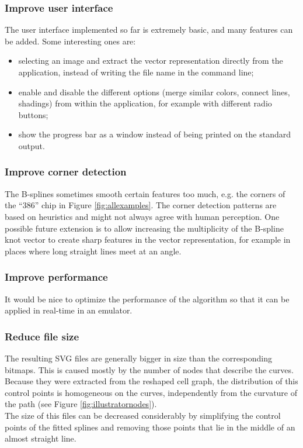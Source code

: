 \documentclass[]{usiinfbachelorproject}
\begin{document}
\subsubsection{Improve user interface}

The user interface implemented so far is extremely basic, and many features can be added. Some interesting ones are: 
\begin{itemize}
	\item selecting an image and extract the vector representation directly from the application, instead of writing the file name in the command line;
	\item enable and disable the different options (merge similar colors, connect lines, shadings) from within the application, for example with different radio buttons;
	\item show the progress bar as a window instead of being printed on the standard output.
\end{itemize}

\subsubsection{Improve corner detection}

The B-splines sometimes smooth certain features too much, e.g. the corners of the ``386'' chip in Figure \ref{fig:allexamples}. The corner detection patterns are based on heuristics and might not always agree with human perception. One possible future extension is to allow increasing the multiplicity of the B-spline knot vector to create sharp features in the vector representation, for example in places where long straight lines meet at an angle.

\subsubsection{Improve performance}

It would be nice to optimize the performance of the algorithm so that it can be applied in real-time in an emulator.

\subsubsection{Reduce file size}

The resulting SVG files are generally bigger in size than the corresponding bitmaps. This is caused mostly by the number of nodes that describe the curves. Because they were extracted from the reshaped cell graph, the distribution of this control points is homogeneous on the curves, independently from the curvature of the path (see Figure \ref{fig:illustratornodes}).\\
The size of this files can be decreased considerably by simplifying the control points of the fitted splines and removing those points that lie in the middle of an almost straight line.
\end{document}
